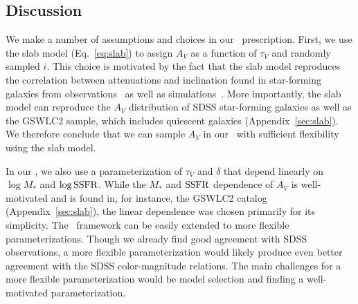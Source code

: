 \subsection{Discussion}  
We make a number of assumptions and choices in our \eda~prescription. 
First, we use the slab model (Eq.~\ref{eq:slab}) to assign $A_V$ as a
function of $\tau_V$ and randomly sampled $i$. 
This choice is motivated by the fact that the slab model reproduces
the correlation between attenuations and inclination found in star-forming
galaxies from observations~\citep{conroy2010b, wild2011, battisti2017,
salim2020} as well as simulations~\citep[\eg][]{chevallard2013,
narayanan2018, trayford2020}.
More importantly, the slab model can reproduce the $A_V$ distribution of
SDSS star-forming galaxies as well as the GSWLC2 sample, which includes
quiescent galaxies (Appendix~\ref{sec:slab}).
We therefore conclude that we can sample $A_V$ in our \eda~with sufficient
flexibility using the slab model. 

In our \eda, we also use a parameterization of $\tau_V$ and $\delta$ that
depend linearly on $\log M_*$ and $\log {\rm SSFR}$. 
While the $M_*$ and ${\rm SSFR}$ dependence of $A_V$ is well-motivated and is
found in, for instance, the \cite{salim2018} GSWLC2 catalog (Appendix~\ref{sec:slab}), 
the linear dependence was chosen primarily for its simplicity.
The \eda~framework can be easily extended to more flexible
parameterizations. 
Though we already find good agreement with SDSS observations, a more
flexible parameterization would likely produce
even better agreement with the SDSS color-magnitude relations. 
The main challenges for a more flexible parameterization would be model
selection and finding a well-motivated parameterization. 

